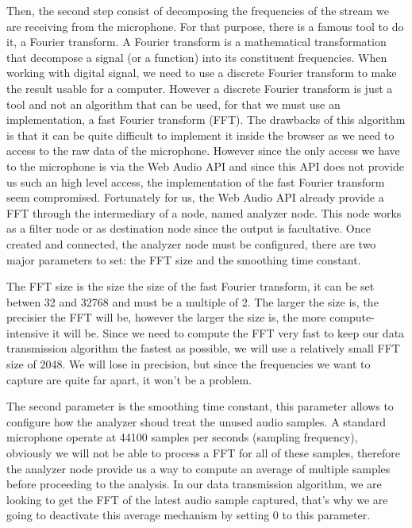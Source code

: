 \documentclass[twocolumn,14pt]{extarticle}
\begin{document}
Then, the second step consist of decomposing the frequencies of the stream we are receiving from the microphone. For that purpose, there is a famous tool to do it, a Fourier transform. A Fourier transform is a mathematical transformation that decompose a signal (or a function) into its constituent frequencies. When working with digital signal, we need to use a discrete Fourier transform to make the result usable for a computer. However a discrete Fourier transform is just a tool and not an algorithm that can be used, for that we must use an implementation, a fast Fourier transform (FFT). The drawbacks of this algorithm is that it can be quite difficult to implement it inside the browser as we need to access to the raw data of the microphone. However since the only access we have to the microphone is via the Web Audio API and since this API does not provide us such an high level access, the implementation of the fast Fourier transform seem compromised. Fortunately for us, the Web Audio API already provide a FFT through the intermediary of a node, named analyzer node. This node works as a filter node or as destination node since the output is facultative. Once created and connected, the analyzer node must be configured, there are two major parameters to set: the FFT size and the smoothing time constant. 

The FFT size is the size the size of the fast Fourier transform, it can be set betwen 32 and 32768 and must be a multiple of 2. The larger the size is, the precisier the FFT will be, however the larger the size is, the more compute-intensive it will be. Since we need to compute the FFT very fast to keep our data transmission algorithm the fastest as possible, we will use a relatively small FFT size of 2048. We will lose in precision, but since the frequencies we want to capture are quite far apart, it won't be a problem. 

The second parameter is the smoothing time constant, this parameter allows to configure how the analyzer shoud treat the unused audio samples. A standard microphone operate at 44100 samples per seconds (sampling frequency), obviously we will not be able to process a FFT for all of these samples, therefore the analyzer node provide us a way to compute an average of multiple samples before proceeding to the analysis. In our data transmission algorithm, we are looking to get the FFT of the latest audio sample captured, that's why we are going to deactivate this average mechanism by setting 0 to this parameter.
\end{document}
